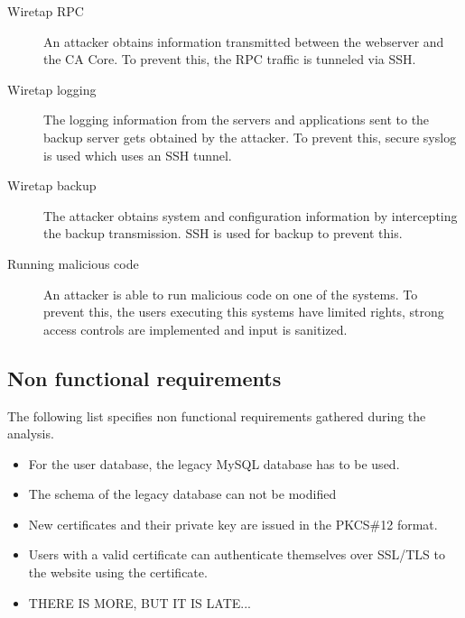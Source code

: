 \documentclass[a4paper, toc=index, 12pt, DIV14, twoside, BCOR2cm, headsepline, numbers=noenddot, bibliography=totoc]{scrbook}
\begin{document}
\begin{description}
\item[Wiretap RPC ] An attacker obtains information transmitted between the webserver and the CA Core. To prevent this, the RPC traffic is tunneled via SSH.
\item[Wiretap logging ] The logging information from the servers and applications sent to the backup server gets obtained by the attacker. To prevent this, secure syslog is used which uses an SSH tunnel.
\item[Wiretap backup ] The attacker obtains system and configuration information by intercepting the backup transmission. SSH is used for backup to prevent this.
\item[Running malicious code ] An attacker is able to run malicious code on one of the systems. To prevent this, the users executing this systems have limited rights, strong access controls are implemented and input is sanitized.
\end{description}

\subsection{Non functional requirements}
The following list specifies non functional requirements gathered during the analysis.
\begin{itemize}
\item For the user database, the legacy MySQL database has to be used.
\item The schema of the legacy database can not be modified
\item New certificates and their private key are issued in the PKCS\#12 format.
\item Users with a valid certificate can authenticate themselves over SSL/TLS to the website using the certificate.
\item THERE IS MORE, BUT IT IS LATE...
\end{itemize}
\end{document}
